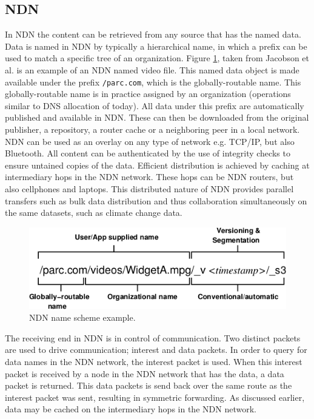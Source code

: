 

\subsection{NDN}
\label{overview-ndn}
In NDN the content can be retrieved from any source that has the named data. Data is named in NDN by typically a hierarchical name, in which a prefix can be used to match a specific tree of an organization. Figure \ref{fig:ndn_name}, taken from Jacobson et al. \cite{jacobson2009networking} is an example of an NDN named video file. This named data object is made available under the prefix \texttt{/parc.com}, which is the globally-routable name. This globally-routable name is in practice assigned by an organization (operations similar to DNS allocation of today). All data under this prefix are automatically published and available in NDN. These can then be downloaded from the original publisher, a repository, a router cache or a neighboring peer in a local network. NDN can be used as an overlay on any type of network e.g. TCP/IP, but also Bluetooth. All content can be authenticated by the use of integrity checks to ensure untained copies of the data. Efficient distribution is achieved by caching at intermediary hops in the NDN network. These hops can be NDN routers, but also cellphones and laptops. This distributed nature of NDN provides parallel transfers such as bulk data distribution and thus collaboration simultaneously on the same datasets, such as climate change data.

\begin{figure}[H]
\centering
\includegraphics[width=\columnwidth/2]{Images/ndn_name.png}
\caption{NDN name scheme example.}
\label{fig:ndn_name}
\end{figure}

The receiving end in NDN is in control of communication. Two distinct packets are used to drive communication; interest and data packets. In order to query for data names in the NDN network, the interest packet is used. When this interest packet is received by a node in the NDN network that has the data, a data packet is returned. This data packets is send back over the same route as the interest packet was sent, resulting in symmetric forwarding. As discussed earlier, data may be cached on the intermediary hops in the NDN network.

